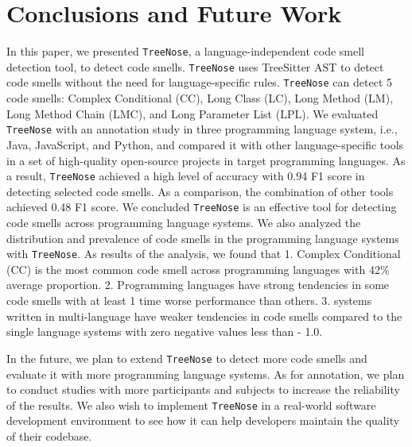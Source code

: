\section{Conclusions and Future Work}
\label{sec:conclusions-and-future-work}

In this paper, we presented \texttt{TreeNose}, a language-independent code smell detection tool, to detect code smells.
\texttt{TreeNose} uses TreeSitter AST to detect code smells without the need for language-specific rules.
\texttt{TreeNose} can detect 5 code smells: Complex Conditional (CC), Long Class (LC), Long Method (LM), Long Method Chain (LMC), and Long Parameter List (LPL).
We evaluated \texttt{TreeNose} with an annotation study in three programming language system, i.e., Java, JavaScript, and Python,
and compared it with other language-specific tools in a set of high-quality open-source projects in target programming languages. 
As a result, \texttt{TreeNose} achieved a high level of accuracy with 0.94 F1 score in detecting selected code smells. As a comparison, the combination of other tools achieved 0.48 F1 score.
We concluded \texttt{TreeNose} is an effective tool for detecting code smells across programming language systems.
We also analyzed the distribution and prevalence of code smells in the programming language systems with \texttt{TreeNose}. As results of the analysis, we found that
1. Complex Conditional (CC) is the most common code smell across programming languages with 42\% average proportion.
2. Programming languages have strong tendencies in some code smells with at least 1 time worse performance than others.
3. systems written in multi-language have weaker tendencies in code smells compared to the single language systems with zero negative values less than - 1.0.

In the future, we plan to extend \texttt{TreeNose} to detect more code smells and evaluate it with more programming language systems. As for annotation,
we plan to conduct studies with more participants and subjects to increase the reliability of the results.
We also wish to implement \texttt{TreeNose} in a real-world software development environment to see how it can help developers maintain the quality of their codebase.